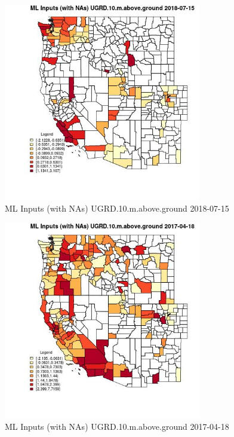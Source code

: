 \begin{figure} 
\centering  
\includegraphics[width=0.77\textwidth]{Code_Outputs/Report_ML_input_PM25_Step4_part_e_de_duplicated_aves_compiled_2019-05-21wNAs_CountyUGRD10mabovegroundMean2018-07-15.jpg} 
\caption{\label{fig:Report_ML_input_PM25_Step4_part_e_de_duplicated_aves_compiled_2019-05-21wNAsCountyUGRD10mabovegroundMean2018-07-15}ML Inputs (with NAs) UGRD.10.m.above.ground 2018-07-15} 
\end{figure} 
 

\begin{figure} 
\centering  
\includegraphics[width=0.77\textwidth]{Code_Outputs/Report_ML_input_PM25_Step4_part_e_de_duplicated_aves_compiled_2019-05-21wNAs_CountyUGRD10mabovegroundMean2017-04-18.jpg} 
\caption{\label{fig:Report_ML_input_PM25_Step4_part_e_de_duplicated_aves_compiled_2019-05-21wNAsCountyUGRD10mabovegroundMean2017-04-18}ML Inputs (with NAs) UGRD.10.m.above.ground 2017-04-18} 
\end{figure} 
 

